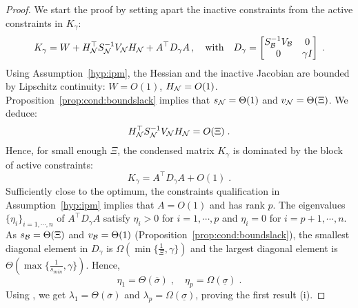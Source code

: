 \begin{proof}
  We start the proof by setting apart the inactive constraints from the active constraints in $K_\gamma$:
  \begin{equation}
    K_\gamma = W + H_{\mathcal{N}}^\top S_{\mathcal{N}}^{-1} V_{\mathcal{N}} H_{\mathcal{N}}
    + A^\top D_\gamma A \, ,
    \quad
    \text{with} \quad D_\gamma = \begin{bmatrix} S_{\mathcal{B}}^{-1} V_{\mathcal{B}} & 0 \\ 0 & \gamma I \end{bmatrix} \; .
  \end{equation}
  Using Assumption~\ref{hyp:ipm}, the Hessian and the inactive Jacobian
  are bounded by Lipschitz continuity: $W = O(1)$, $H_{\mathcal{N}} = O(1)$.
  Proposition~\ref{prop:cond:boundslack} implies that
  $s_{\mathcal{N}} = \Theta(1)$ and $v_{\mathcal{N}} = \Theta(\Xi)$. We deduce:
  \begin{equation}
    \label{eq:cond:inactiveblock}
    H_{\mathcal{N}}^\top S_{\mathcal{N}}^{-1} V_{\mathcal{N}} H_{\mathcal{N}} = O(\Xi) \; .
  \end{equation}
  Hence, for small enough $\Xi$,
  the condensed matrix $K_\gamma$ is dominated by the block of active constraints:
  \begin{equation}
    K_\gamma = A^\top D_\gamma A + O(1) \; .
  \end{equation}
  Sufficiently close to the optimum, the constraints qualification
  in Assumption~\ref{hyp:ipm} implies that $A = O(1)$ and has rank $p$.
  The eigenvalues $\{\eta_i\}_{i =1,\cdots,n}$ of $A^\top D_\gamma A$
  satisfy $\eta_i > 0$ for $i = 1,\cdots,p$ and $\eta_i = 0$ for $i = p+1, \cdots, n$.
  As $s_{\mathcal{B}} = \Theta(\Xi)$ and $v_{\mathcal{B}} = \Theta(1)$
  (Proposition~\ref{prop:cond:boundslack}), the smallest diagonal
  element in $D_\gamma$ is $\Omega(\min\{\frac{1}{\Xi}, \gamma\})$
  and the largest diagonal element is $\Theta(\max\{\frac{1}{s_{min}}, \gamma\})$.
  Hence,
  \begin{equation}
    \eta_1 = \Theta(\overline{\sigma}) \; , \quad
    \eta_p = \Omega(\underline{\sigma}) \; .
  \end{equation}
  Using \cite[Lemma 3.1]{wright1998ill}, we get $\lambda_1 = \Theta(\overline{\sigma})$
  and $\lambda_p = \Omega(\underline{\sigma})$, proving the first result (i).


\end{proof}
